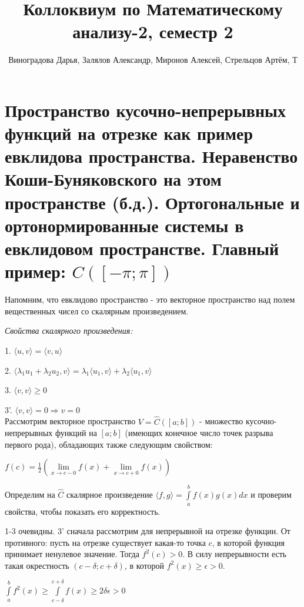 \documentclass{article}
\title{Коллоквиум по Математическому анализу-2, семестр 2}
\author{Виноградова Дарья, Залялов Александр, Миронов Алексей, Стрельцов Артём, Т}
\date{}
\begin{document}
	\maketitle

	\tableofcontents

	\clearpage

	\setcounter{section}{0}
	
	\section{Пространство кусочно-непрерывных функций на отрезке как пример евклидова пространства. Неравенство Коши-Буняковского на этом пространстве (б.д.). Ортогональные и ортонормированные системы в евклидовом пространстве. Главный пример: $C([-\pi; \pi])$}
	
	Напомним, что евклидово пространство - это векторное пространство над полем вещественных чисел со скалярным произведением.
	
	\textit{Свойства скалярного произведения:}
	
	1. $\langle u, v \rangle=\langle v, u\rangle$
	
	2. $\langle \lambda_1 u_1 + \lambda_2 u_2, v\rangle=\lambda_1 \langle u_1, v\rangle+\lambda_2 \langle u_1, v \rangle$
	
	3. $\langle v,v \rangle \ge 0$
	
	3'. $\langle v,v \rangle = 0 \Rightarrow v=0$\\
	
	Рассмотрим векторное пространство $V=\hat C([a; b])$ - множество кусочно-непрерывных функций на $[a; b]$ (имеющих конечное число точек разрыва первого рода), обладающих также следующим свойством:
	
	$f(c)=\frac{1}{2}(\lim\limits_{x \rightarrow c-0} f(x) + \lim\limits_{x \rightarrow c+0} f(x))$
	
	 Определим на $\hat C$ скалярное произведение $\langle f, g \rangle =\int\limits_a^b f(x)g(x)dx$ и проверим свойства, чтобы показать его корректность.
	
	1-3 очевидны. 3' сначала рассмотрим для непрерывной на отрезке функции. 
	От противного: пусть на отрезке существует какая-то точка $c$, в которой функция принимает ненулевое значение. Тогда $f^2(c) > 0$. В силу непрерывности есть такая окрестность $(c-\delta; c+\delta)$, в которой $f^2(x) \ge \epsilon > 0$.
	
	$\int\limits_a^b f^2(x) \ge \int\limits_{c-\delta}^{c+\delta} f(x) \ge 2\delta\epsilon > 0$
	
\end{document}
